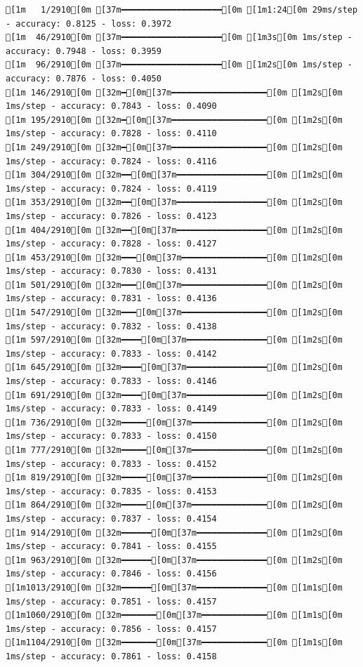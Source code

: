 \documentclass[
  letterpaper,
  DIV=11,
  numbers=noendperiod]{scrartcl}
\begin{document}
\begin{verbatim}
[1m   1/2910[0m [37m━━━━━━━━━━━━━━━━━━━━[0m [1m1:24[0m 29ms/step - accuracy: 0.8125 - loss: 0.3972
[1m  46/2910[0m [37m━━━━━━━━━━━━━━━━━━━━[0m [1m3s[0m 1ms/step - accuracy: 0.7948 - loss: 0.3959   
[1m  96/2910[0m [37m━━━━━━━━━━━━━━━━━━━━[0m [1m2s[0m 1ms/step - accuracy: 0.7876 - loss: 0.4050
[1m 146/2910[0m [32m━[0m[37m━━━━━━━━━━━━━━━━━━━[0m [1m2s[0m 1ms/step - accuracy: 0.7843 - loss: 0.4090
[1m 195/2910[0m [32m━[0m[37m━━━━━━━━━━━━━━━━━━━[0m [1m2s[0m 1ms/step - accuracy: 0.7828 - loss: 0.4110
[1m 249/2910[0m [32m━[0m[37m━━━━━━━━━━━━━━━━━━━[0m [1m2s[0m 1ms/step - accuracy: 0.7824 - loss: 0.4116
[1m 304/2910[0m [32m━━[0m[37m━━━━━━━━━━━━━━━━━━[0m [1m2s[0m 1ms/step - accuracy: 0.7824 - loss: 0.4119
[1m 353/2910[0m [32m━━[0m[37m━━━━━━━━━━━━━━━━━━[0m [1m2s[0m 1ms/step - accuracy: 0.7826 - loss: 0.4123
[1m 404/2910[0m [32m━━[0m[37m━━━━━━━━━━━━━━━━━━[0m [1m2s[0m 1ms/step - accuracy: 0.7828 - loss: 0.4127
[1m 453/2910[0m [32m━━━[0m[37m━━━━━━━━━━━━━━━━━[0m [1m2s[0m 1ms/step - accuracy: 0.7830 - loss: 0.4131
[1m 501/2910[0m [32m━━━[0m[37m━━━━━━━━━━━━━━━━━[0m [1m2s[0m 1ms/step - accuracy: 0.7831 - loss: 0.4136
[1m 547/2910[0m [32m━━━[0m[37m━━━━━━━━━━━━━━━━━[0m [1m2s[0m 1ms/step - accuracy: 0.7832 - loss: 0.4138
[1m 597/2910[0m [32m━━━━[0m[37m━━━━━━━━━━━━━━━━[0m [1m2s[0m 1ms/step - accuracy: 0.7833 - loss: 0.4142
[1m 645/2910[0m [32m━━━━[0m[37m━━━━━━━━━━━━━━━━[0m [1m2s[0m 1ms/step - accuracy: 0.7833 - loss: 0.4146
[1m 691/2910[0m [32m━━━━[0m[37m━━━━━━━━━━━━━━━━[0m [1m2s[0m 1ms/step - accuracy: 0.7833 - loss: 0.4149
[1m 736/2910[0m [32m━━━━━[0m[37m━━━━━━━━━━━━━━━[0m [1m2s[0m 1ms/step - accuracy: 0.7833 - loss: 0.4150
[1m 777/2910[0m [32m━━━━━[0m[37m━━━━━━━━━━━━━━━[0m [1m2s[0m 1ms/step - accuracy: 0.7833 - loss: 0.4152
[1m 819/2910[0m [32m━━━━━[0m[37m━━━━━━━━━━━━━━━[0m [1m2s[0m 1ms/step - accuracy: 0.7835 - loss: 0.4153
[1m 864/2910[0m [32m━━━━━[0m[37m━━━━━━━━━━━━━━━[0m [1m2s[0m 1ms/step - accuracy: 0.7837 - loss: 0.4154
[1m 914/2910[0m [32m━━━━━━[0m[37m━━━━━━━━━━━━━━[0m [1m2s[0m 1ms/step - accuracy: 0.7841 - loss: 0.4155
[1m 963/2910[0m [32m━━━━━━[0m[37m━━━━━━━━━━━━━━[0m [1m2s[0m 1ms/step - accuracy: 0.7846 - loss: 0.4156
[1m1013/2910[0m [32m━━━━━━[0m[37m━━━━━━━━━━━━━━[0m [1m1s[0m 1ms/step - accuracy: 0.7851 - loss: 0.4157
[1m1060/2910[0m [32m━━━━━━━[0m[37m━━━━━━━━━━━━━[0m [1m1s[0m 1ms/step - accuracy: 0.7856 - loss: 0.4157
[1m1104/2910[0m [32m━━━━━━━[0m[37m━━━━━━━━━━━━━[0m [1m1s[0m 1ms/step - accuracy: 0.7861 - loss: 0.4158

\end{verbatim}
\end{document}
